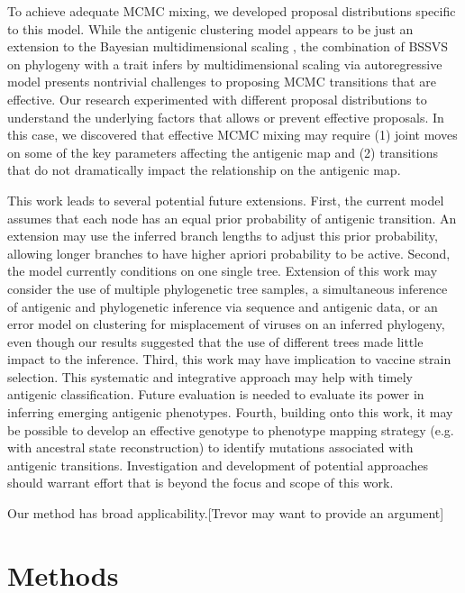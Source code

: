 \documentclass[11pt,oneside,letterpaper]{article}
\begin{document}
To achieve adequate MCMC mixing, we developed proposal distributions specific to this model. 
While the antigenic clustering model appears to be just an extension to the Bayesian multidimensional scaling \cite{bedford_integrating_2014}, the combination of BSSVS on phylogeny with a trait infers by multidimensional scaling via autoregressive model presents nontrivial challenges to proposing MCMC transitions that are effective. 
Our research experimented with different proposal distributions to understand the underlying factors that allows or prevent effective proposals. 
In this case, we discovered that effective MCMC mixing may require (1) joint moves on some of the key parameters affecting the antigenic map and (2) transitions that do not dramatically impact the relationship on the antigenic map.


This work leads to several potential future extensions. 
First, the current model assumes that each node has an equal prior probability of antigenic transition. 
An extension may use the inferred branch lengths to adjust this prior probability, allowing longer branches to have higher apriori probability to be active.
Second, the model currently conditions on one single tree. 
Extension of this work may consider the use of multiple phylogenetic tree samples, a simultaneous inference of antigenic and phylogenetic inference via sequence and antigenic data, or  an error model on clustering for misplacement of viruses on an inferred phylogeny, even though our results suggested that the use of different trees made little impact to the inference. 
Third, this work may have implication to vaccine strain selection. 
This systematic and integrative approach may help with timely antigenic classification. 
Future evaluation is needed to evaluate its power in inferring emerging antigenic phenotypes. 
Fourth, building onto this work, it may be possible to develop an effective genotype to phenotype mapping strategy (e.g. with ancestral state reconstruction) to identify mutations associated with antigenic transitions. 
Investigation and development of potential approaches should warrant effort that is beyond the focus and scope of this work.



Our method has broad applicability.[Trevor may want to provide an argument]



\newpage




\section*{Methods}
\end{document}
